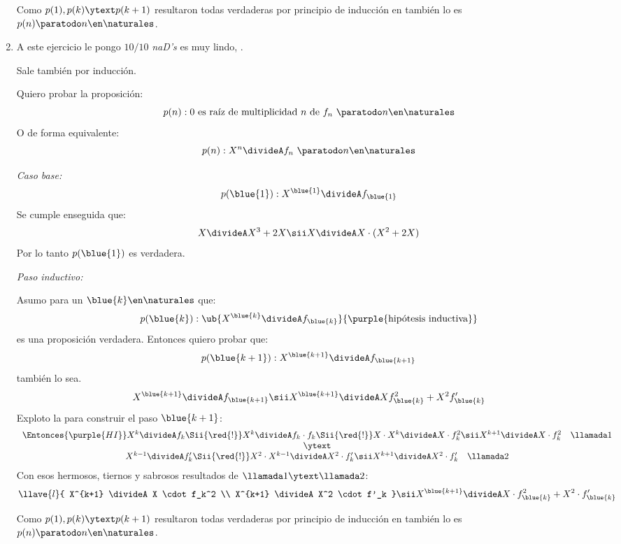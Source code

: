 \begin{enumerate}[label=\roman*)]
	      Como $p(1), p(k) \ytext p(k+1)$ resultaron todas verdaderas por principio de inducción en también lo es $p(n) \paratodo n \en \naturales$.

	\item A este ejercicio le pongo $10/10$ \textit{naD's} es muy lindo, .

	      Sale también por inducción.


	      Quiero probar la proposición:
	      $$
		      p(n) : \text{0 es raíz de multiplicidad $n$ de $f_n \ \paratodo n \en \naturales$}
	      $$
	      O de forma equivalente:
	      $$
		      p(n) :  X^n \divideA f_n \ \paratodo n \en \naturales
	      $$

	      \textit{Caso base:}
	      $$
		      p(\blue{1}) : X^{\blue{1}} \divideA f_{\blue{1}}
	      $$
	      Se cumple enseguida que:
	      $$
		      X \divideA X^3 + 2X
		      \sii
		      X \divideA X \cdot (X^2 + 2X)
	      $$
	      Por lo tanto $p(\blue{1})$ es verdadera.

	      \textit{Paso inductivo:}

	      Asumo para un $\blue{k} \en \naturales$ que:
	      $$
		      p(\blue{k}) : \ub{
			      X^{\blue{k}} \divideA f_{\blue{k}}
		      }{
			      \text{\purple{hipótesis inductiva}}
		      }
	      $$
	      es una proposición verdadera. Entonces quiero probar que:
	      $$
		      p(\blue{k + 1}) : X^{\blue{k+1}} \divideA f_{\blue{k+1}}
	      $$
	      también lo sea.
	      $$
		      X^{\blue{k+1}} \divideA f_{\blue{k+1}}
		      \sii
		      X^{\blue{k+1}} \divideA Xf_{\blue{k}}^2 + X^2f'_{\blue{k}}
	      $$
	      Exploto la  para construir el paso $\blue{k+1}$:
	      $$
		      \begin{array}{c}
			      \Entonces{\purple{HI}}
			      X^k \divideA f_k
			      \Sii{\red{!}}
			      X^k \divideA f_k \cdot f_k
			      \Sii{\red{!}}
			      X \cdot X^k \divideA X\cdot f_k^2
			      \sii
			      X^{k+1} \divideA X \cdot f_k^2  \quad \llamada1 \\
			      \ytext                                          \\
			      X^{k-1} \divideA f'_k
			      \Sii{\red{!}}
			      X^2 \cdot X^{k-1} \divideA X^2 \cdot f'_k
			      \sii
			      X^{k+1} \divideA X^2 \cdot f'_k \quad \llamada2
		      \end{array}
	      $$
	      Con esos hermosos, tiernos y sabrosos resultados de $\llamada1 \ytext \llamada2$:
	      $$
		      \llave{l}{
			      X^{k+1} \divideA X \cdot f_k^2  \\
			      X^{k+1} \divideA X^2 \cdot f'_k
		      }
		      \sii
		      X^{\blue{k+1}} \divideA X \cdot f_{\blue{k}}^2 +  X^2 \cdot f'_{\blue{k}} \\
	      $$

	      \medskip

	      Como $p(1), p(k) \ytext p(k+1)$ resultaron todas verdaderas por principio de inducción en también lo es $p(n) \paratodo n \en \naturales$.


\end{enumerate}

\begin{aportes}
	\item {}
\end{aportes}

